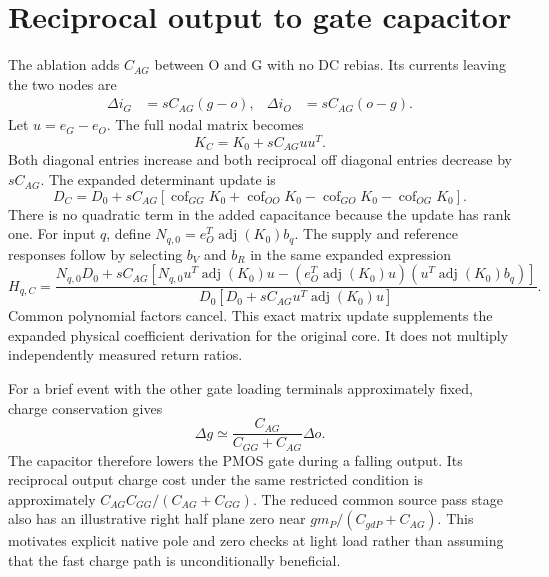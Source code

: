 \documentclass{article}
\begin{document}
\section*{Reciprocal output to gate capacitor}
The ablation adds $C_{AG}$ between O and G with no DC rebias. Its currents
leaving the two nodes are
\begin{align}
\Delta i_G&=sC_{AG}(g-o),&\Delta i_O&=sC_{AG}(o-g).
\end{align}
Let $u=e_G-e_O$. The full nodal matrix becomes
\begin{equation}
K_C=K_0+sC_{AG}uu^T.
\end{equation}
Both diagonal entries increase and both reciprocal off diagonal entries
decrease by $sC_{AG}$. The expanded determinant update is
\begin{equation}
D_C=D_0+sC_{AG}\left[
\operatorname{cof}_{GG}K_0+\operatorname{cof}_{OO}K_0
-\operatorname{cof}_{GO}K_0-\operatorname{cof}_{OG}K_0\right].
\end{equation}
There is no quadratic term in the added capacitance because the update
has rank one. For input $q$, define $N_{q,0}=e_O^T\operatorname{adj}(K_0)b_q$.
The supply and reference responses follow by selecting $b_V$ and $b_R$
in the same expanded expression
\begin{equation}
H_{q,C}=\frac{N_{q,0}D_0+sC_{AG}
\left[N_{q,0}u^T\operatorname{adj}(K_0)u
-(e_O^T\operatorname{adj}(K_0)u)(u^T\operatorname{adj}(K_0)b_q)\right]}
{D_0\left[D_0+sC_{AG}u^T\operatorname{adj}(K_0)u\right]}.
\end{equation}
Common polynomial factors cancel. This exact matrix update supplements
the expanded physical coefficient derivation for the original core.
It does not multiply independently measured return ratios.

For a brief event with the other gate loading terminals approximately
fixed, charge conservation gives
\begin{equation}
\Delta g\simeq\frac{C_{AG}}{C_{GG}+C_{AG}}\Delta o.
\end{equation}
The capacitor therefore lowers the PMOS gate during a falling output.
Its reciprocal output charge cost under the same restricted condition
is approximately $C_{AG}C_{GG}/(C_{AG}+C_{GG})$. The reduced common
source pass stage also has an illustrative right half plane zero near
$gm_P/(C_{gdP}+C_{AG})$. This motivates explicit native pole and zero
checks at light load rather than assuming that the fast charge path is
unconditionally beneficial.
\end{document}
